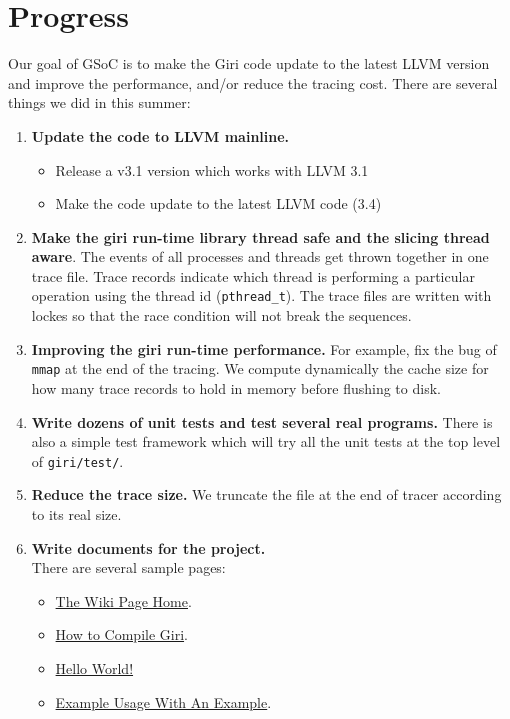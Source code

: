 \documentclass[DIV=calc, paper=a4, fontsize=11pt, twocolumn]{scrartcl}
\begin{document}
\section*{Progress}
Our goal of GSoC is to make the Giri code update to the latest LLVM version and improve the performance, and/or reduce the tracing cost.
There are several things we did in this summer:
\begin{enumerate}
	\item \textbf{Update the code to LLVM mainline.}
		\begin{itemize}
			\item Release a v3.1 version which works with LLVM 3.1
			\item Make the code update to the latest LLVM code (3.4)
		\end{itemize}
	\item \textbf{Make the giri run-time library thread safe and the slicing thread aware}.
		The events of all processes and threads get thrown together in one trace file.
		Trace records indicate which thread is performing a particular operation using the thread id (\texttt{pthread\_t}).
		The trace files are written with lockes so that the race condition will not break the sequences.
	\item \textbf{Improving the giri run-time performance.}
		For example, fix the bug of \texttt{mmap} at the end of the tracing.
		We compute dynamically the cache size for how many trace records to hold in memory before flushing to disk.
	\item \textbf{Write dozens of unit tests and test several real programs.}
		There is also a simple test framework which will try all the unit tests at the top level of \texttt{giri/test/}.
	\item \textbf{Reduce the trace size.}
		We truncate the file at the end of tracer according to its real size.
	\item \textbf{Write documents for the project.}\\
		There are several sample pages:
		\begin{itemize}
			\item \href{https://github.com/liuml07/giri/wiki}{The Wiki Page Home}.
			\item \href{https://github.com/liuml07/giri/wiki/How-to-Compile-Giri}{How to Compile Giri}.
			\item \href{https://github.com/liuml07/giri/wiki/Hello-World}{Hello World!}
			\item \href{https://github.com/liuml07/giri/wiki/Example-Usage}{Example Usage With An Example}.
		\end{itemize}
\end{enumerate}
\end{document}
